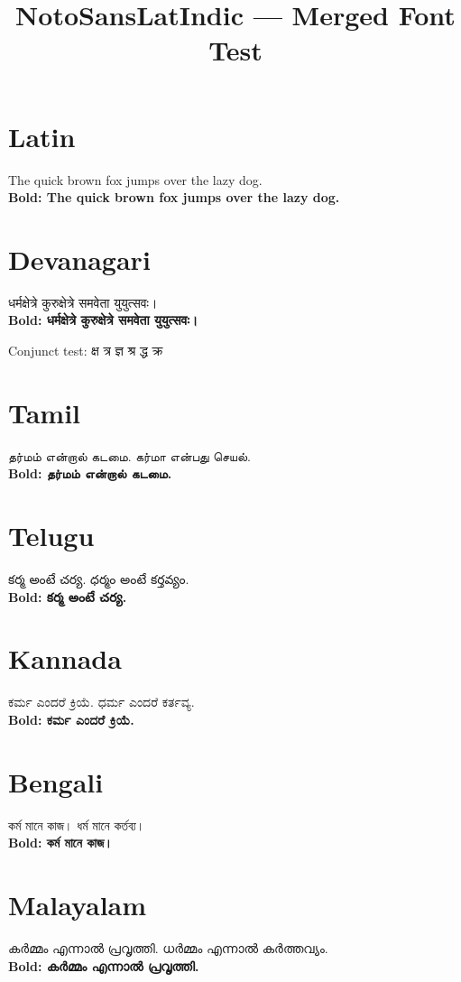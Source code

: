\documentclass[a4paper,12pt]{article}
\title{NotoSansLatIndic --- Merged Font Test}
\author{}
\date{}
\begin{document}
\maketitle

\section{Latin}
The quick brown fox jumps over the lazy dog. \\
\textbf{Bold: The quick brown fox jumps over the lazy dog.}

\section{Devanagari}
धर्मक्षेत्रे कुरुक्षेत्रे समवेता युयुत्सवः। \\
\textbf{Bold: धर्मक्षेत्रे कुरुक्षेत्रे समवेता युयुत्सवः।}

Conjunct test: क्ष त्र ज्ञ श्र द्ध क्र

\section{Tamil}
தர்மம் என்றால் கடமை. கர்மா என்பது செயல். \\
\textbf{Bold: தர்மம் என்றால் கடமை.}

\section{Telugu}
కర్మ అంటే చర్య. ధర్మం అంటే కర్తవ్యం. \\
\textbf{Bold: కర్మ అంటే చర్య.}

\section{Kannada}
ಕರ್ಮ ಎಂದರೆ ಕ್ರಿಯೆ. ಧರ್ಮ ಎಂದರೆ ಕರ್ತವ್ಯ. \\
\textbf{Bold: ಕರ್ಮ ಎಂದರೆ ಕ್ರಿಯೆ.}

\section{Bengali}
কর্ম মানে কাজ। ধর্ম মানে কর্তব্য। \\
\textbf{Bold: কর্ম মানে কাজ।}

\section{Malayalam}
കർമ്മം എന്നാൽ പ്രവൃത്തി. ധർമ്മം എന്നാൽ കർത്തവ്യം. \\
\textbf{Bold: കർമ്മം എന്നാൽ പ്രവൃത്തി.}
\end{document}
